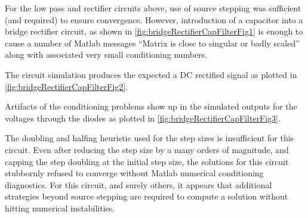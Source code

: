 For the low pass and rectifier circuits above, use of source stepping was sufficient (and required) to ensure convergence.
However, introduction of a capacitor into a bridge rectifier circuit, as shown in \cref{fig:bridgeRectifierCapFilterFig1} is enough to cause a number of Matlab messages ``Matrix is close to singular or badly scaled'' along with associated very small conditioning numbers.



The circuit simulation produces the expected a DC rectified signal as plotted in \cref{fig:bridgeRectifierCapFilterFig2}.


Artifacts of the conditioning problems show up in the simulated outputs for the voltages through the diodes as plotted in \cref{fig:bridgeRectifierCapFilterFig3}.


The doubling and halfing heuristic used for the step sizes is insufficient for this circuit.
Even after
reducing the step size by a many orders of magnitude, and capping the step doubling at the initial step size, the solutions for this circuit stubbornly refused to converge without Matlab numerical conditioning diagnostics.
For this circuit, and surely others, it appears that additional strategies beyond source stepping are required to compute a solution without hitting numerical instabilities.

